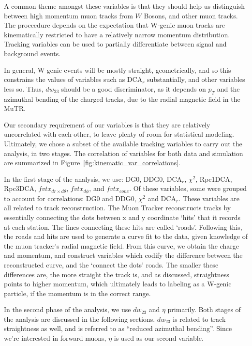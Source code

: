 A common theme amongst these variables is that they should help us distinguish
between high momentum muon tracks from $W$ Bosons, and other muon tracks. The
proceedure depends on the expectation that W-genic muon tracks are kinematically
restricted to have a relatively narrow momentum distribution. Tracking variables
can be used to partially differentiate between signal and background events.

In general, W-genic events will be mostly straight, geometrically, and so this
constrains the values of variables such as DCA${}_r$ substantially, and other
variables less so. Thus, $dw_{23}$ should be a good discriminator, as it depends
on $p_T$ and the azimuthal bending of the charged tracks, due to the radial
magnetic field in the MuTR.

Our secondary requirement of our variables is that they are relatively
uncorrelated with each-other, to leave plenty of room for statistical modeling.
Ultimately, we chose a subset of the available tracking variables to carry out
the analysis, in two stages. The correlation of variables for both data and
simulation are summarized in Figure~\ref{fig:kinematic_var_correlations}.

In the first stage of the analysis, we use: DG0, DDG0, DCA${}_r$, $\chi^2$,
Rpc1DCA, Rpc3DCA, $fvtx_{dr \times d\theta}$, $fvtx_{d\phi}$, and $fvtx_{cone}$.
Of these variables, some were grouped to account for correlations: DG0 and DDG0,
$\chi^2$ and DCA${}_r$. These variables are all related to track reconstruction.
The Muon Tracker reconstructs tracks by essentially connecting the dots between
x and y coordinate `hits' that it records at each station. The lines connecting
these hits are called `roads'. Following this, the roads and hits are used to
generate a curve fit to the data, given knowledge of the muon tracker's radial
magnetic field. From this curve, we obtain the charge and momentum, and 
construct variables which codify the difference between the reconstructed curve,
and the `connect the dots' roads. The smaller these differences are, the more
straight the track is, and as discussed, straightness points to higher momentum,
which ultimately leads to labeling as a W-genic particle, if the momentum is in
the correct range.

In the second phase of the analysis, we use $dw_{23}$ and $\eta$ primarily. Both
stages of the analysis are discussed in the following sections. $dw_{23}$ is
related to track straightness as well, and is referred to as ``reduced azimuthal
bending''. Since we're interested in forward muons, $\eta$ is used as our second
variable.

